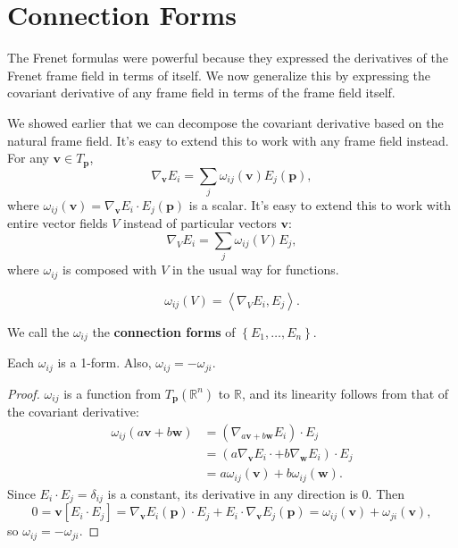 \documentclass[twoside,10pt]{report}
\begin{document}

\section{Connection Forms}

The Frenet formulas were powerful because they expressed the derivatives of the Frenet frame field in terms of itself. We now generalize this by expressing the covariant derivative of any frame field in terms of the frame field itself.

We showed earlier that we can decompose the covariant derivative based on the natural frame field. It's easy to extend this to work with any frame field instead. For any $\mathbf{v} \in T_{\mathbf{p}}$,
\[
	\nabla_{\mathbf{v}}E_i = \sum_j \omega_{ij}(\mathbf{v}) E_j(\mathbf{p}),
\] where $\omega_{ij}(\mathbf{v}) = \nabla_{\mathbf{v}}E_i \cdot E_{j}(\mathbf{p})$ is a scalar. It's easy to extend this to work with entire vector fields $V$ instead of particular vectors $\mathbf{v}$:
\[
	\nabla_{V}E_i = \sum_j \omega_{ij}(V) E_j,
\] where $\omega_{ij}$ is composed with $V$ in the usual way for functions.

{\color{red}\[
		\omega_{ij}(V) = \left\langle \nabla_{V}E_i, E_j \right\rangle.
\] }

\begin{defn}[]
We call the $\omega_{ij}$ the \textbf{connection forms} of $\left\{ E_1, \dots, E_n \right\}$.
\end{defn}

\begin{lem}
	Each $\omega_{ij}$ is a 1-form. Also, $\omega_{ij}=-\omega_{ji}$.
\end{lem}
\begin{proof}
	$\omega_{ij}$ is a function from $T_{\mathbf{p}}(\mathbb{R}^n)$ to $\mathbb{R}$, and its linearity follows from that of the covariant derivative:
	\begin{align*}
		\omega_{ij}(a\mathbf{v} + b\mathbf{w}) &= (\nabla_{a\mathbf{v} + b\mathbf{w}}E_i) \cdot E_j \\
						       &= (a \nabla_{\mathbf{v}}E_i\cdot + b\nabla_{\mathbf{w}}E_i)\cdot E_j \\
						       &= a\omega_{ij}(\mathbf{v})+b\omega_{ij}(\mathbf{w}).
	\end{align*}
	Since $E_i \cdot E_j = \delta_{ij}$ is a constant, its derivative in any direction is 0. Then
	\[
		0 = \mathbf{v}[E_i \cdot E_j] = \nabla_{\mathbf{v}}E_i(\mathbf{p})\cdot E_j + E_i \cdot \nabla_{\mathbf{v}}E_j(\mathbf{p}) = \omega_{ij}(\mathbf{v}) + \omega_{ji}(\mathbf{v}),
	\]
	so $\omega_{ij}=-\omega_{ji}$.
\end{proof}
\end{document}
